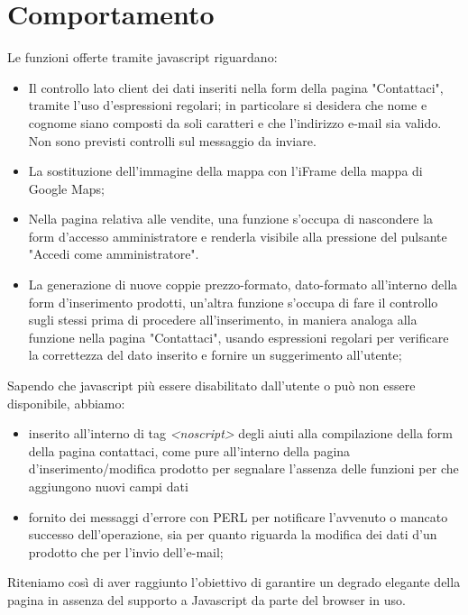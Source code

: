 \section{Comportamento}{
	Le funzioni offerte tramite javascript riguardano: 
	\begin{itemize}\itemsep1pt
		\item Il controllo lato client dei dati inseriti nella form della pagina "Contattaci", tramite l'uso d'espressioni regolari; in particolare si desidera che nome e cognome siano composti da soli caratteri e che l'indirizzo e-mail sia valido. Non sono previsti controlli sul messaggio da inviare.
		\item La sostituzione dell'immagine della mappa con l'iFrame della mappa di Google Maps;
		\item Nella pagina relativa alle vendite, una funzione s'occupa di nascondere la form d'accesso amministratore e renderla visibile alla pressione del pulsante "Accedi come amministratore".
		\item La generazione di nuove coppie prezzo-formato, dato-formato all'interno della form d'inserimento prodotti, un'altra funzione s'occupa di fare il controllo sugli stessi prima di procedere all'inserimento, in maniera analoga alla funzione nella pagina "Contattaci", usando espressioni regolari per verificare la correttezza del dato inserito e fornire un suggerimento all'utente;
	\end{itemize}
	Sapendo che javascript più essere disabilitato dall'utente o può non essere disponibile, abbiamo:
	\begin{itemize}\itemsep1pt
		\item inserito all'interno di tag \textit{<noscript>} degli aiuti alla compilazione della form della pagina contattaci, come pure all'interno della pagina d'inserimento/modifica prodotto per segnalare l'assenza delle funzioni per che aggiungono nuovi campi dati
		\item fornito dei messaggi d'errore con PERL per notificare l'avvenuto o mancato successo dell'operazione, sia per quanto riguarda la modifica dei dati d'un prodotto che per l'invio dell'e-mail;
	\end{itemize}
	Riteniamo così di aver raggiunto l'obiettivo di garantire un degrado elegante della pagina in assenza del supporto a Javascript da parte del browser in uso.
}
